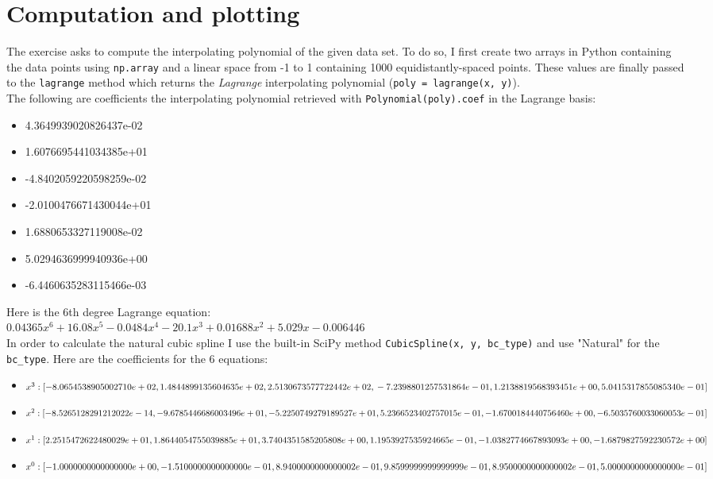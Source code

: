 \documentclass{article}
\newcommand{\code}{\texttt}
\begin{document}
\section{Computation and plotting}
The exercise asks to compute the interpolating polynomial of the given data set. To do so, I first create two arrays in Python containing the data points using \code{np.array} and a linear space from -1 to 1 containing 1000 equidistantly-spaced points. These values are finally passed to the \code{lagrange} method which returns the {\it Lagrange} interpolating polynomial (\code{poly = lagrange(x, y)}). \\

The following are coefficients the interpolating polynomial retrieved with \code{Polynomial(poly).coef} in the Lagrange basis:
 \begin{itemize}
  \item 4.3649939020826437e-02
  \item 1.6076695441034385e+01
  \item -4.8402059220598259e-02
  \item -2.0100476671430044e+01
  \item 1.6880653327119008e-02
  \item 5.0294636999940936e+00
  \item -6.4460635283115466e-03
  \end{itemize}
  
Here is the 6th degree Lagrange equation: \\

$0.04365x^6 + 16.08x^5 - 0.0484x^4 - 20.1x^3 + 0.01688x^2 + 5.029x - 0.006446$\\

In order to calculate the natural cubic spline I use the built-in SciPy method \code{CubicSpline(x, y, bc\_type)} and use "Natural" for the \code{bc\_type}. Here are the coefficients for the 6 equations:
 \begin{itemize}
  \item $x^3: [-8.0654538905002710e+02, 1.4844899135604635e+02,  2.5130673577722442e+02,\\ -7.2398801257531864e-01,  1.2138819568393451e+00,  5.0415317855085340e-01]$
  \item $x^2: [-8.5265128291212022e-14, -9.6785446686003496e+01, -5.2250749279189527e+01,\\ 5.2366523402757015e-01, -1.6700184440756460e+00, -6.5035760033060053e-01]$
  \item $x^1: [ 2.2515472622480029e+01, 1.8644054755039885e+01, 3.7404351585205808e+00,\\ 1.1953927535924665e-01, -1.0382774667893093e+00, -1.6879827592230572e+00]$
   \item $x^0: [-1.0000000000000000e+00, -1.5100000000000000e-01, 8.9400000000000002e-01,\\ 9.8599999999999999e-01, 8.9500000000000002e-01, 5.0000000000000000e-01]$
  \end{itemize}
   
\end{document}
